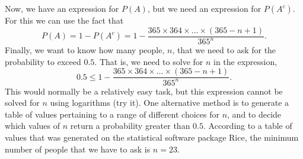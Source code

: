 \noindent Now, we have an expression for $P(A)$, but we need an expression for $P(A^c)$. For this we can use the fact that
\[
P(A) = 1 - P(A^c) = 1 - \frac{365\times364\times\ldots\times(365-n+1)}{365^n}.
\]
Finally, we want to know how many people, $n$, that we need to ask for the probability to exceed $0.5$. That is, we need to solve for $n$ in the expression,
\[
0.5 \leq 1 - \frac{365\times364\times\ldots\times(365-n+1)}{365^n}.
\]
This would normally be a relatively easy task, but this expression cannot be solved for $n$ using logarithms (try it). One alternative method is to generate a table of values pertaining to a range of different choices for $n$, and to decide which values of $n$ return a probability greater than $0.5$. According to a table of values that was generated on the statistical software package Rice, the minimum number of people that we have to ask is $n = 23$.